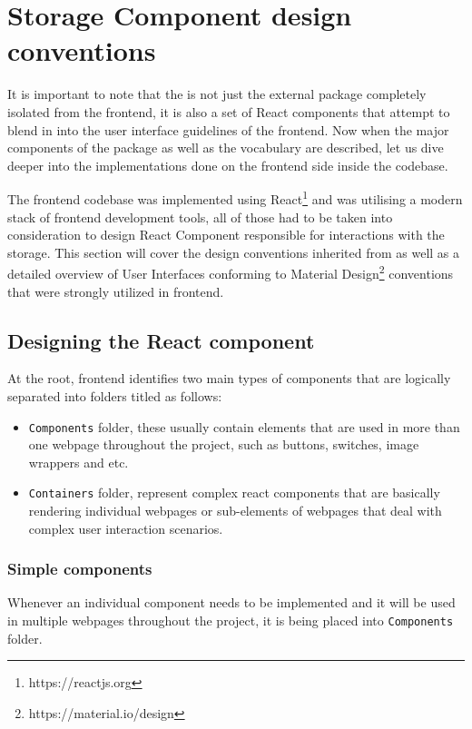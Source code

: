 \section{Storage Component design conventions}


It is important to note that the \lpas{} is not just the external package completely isolated from the \lpa{} frontend, it is also a set of React components that attempt to blend in into the user interface guidelines of the frontend. Now when the major components of the \lpas{} package as well as the \lpas{} vocabulary are described, let us dive deeper into the implementations done on the frontend side inside the \lpa{} codebase. 

The \lpa{} frontend codebase was implemented using React\footnote{https://reactjs.org} and was utilising a modern stack of frontend development tools, all of those had to be taken into consideration to design React Component responsible for interactions with the storage. This section will cover the design conventions inherited from \lpa{} as well as a detailed overview of User Interfaces conforming to Material Design\footnote{https://material.io/design} conventions that were strongly utilized in \lpa{} frontend.  

\subsection{Designing the React component}

At the root, \lpa{} frontend identifies two main types of components that are logically separated into folders titled as follows:
\begin{itemize}
	\item \texttt{Components} folder, these usually contain elements that are used in more than one webpage throughout the project, such as buttons, switches, image wrappers and etc.
	\item \texttt{Containers} folder, represent complex react components that are basically rendering individual webpages or sub-elements of webpages that deal with complex user interaction scenarios.
\end{itemize}

\subsubsection{Simple components}

Whenever an individual component needs to be implemented and it will be used in multiple webpages throughout the project, it is being placed into \texttt{Components} folder.

